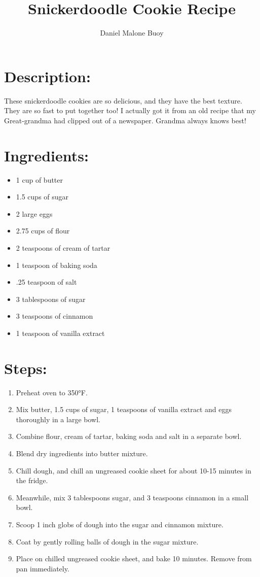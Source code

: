 \documentclass{article}
\title{Snickerdoodle Cookie Recipe}
\author{Daniel Malone Buoy}
\begin{document}
\maketitle

\section*{Description:}
These snickerdoodle cookies are so delicious, and they have the best texture. They are so fast to put together too! I actually got it from an old recipe that my Great-grandma had clipped out of a newspaper. Grandma always knows best!

\section*{Ingredients:}  
\begin{itemize}
\item 1 cup of butter 
\item 1.5 cups of sugar 
\item 2 large eggs 
\item 2.75 cups of flour 
\item 2 teaspoons of cream of tartar 
\item 1 teaspoon of baking soda 
\item .25 teaspoon of salt 
\item 3 tablespoons of sugar 
\item 3 teaspoons of cinnamon 
\item 1 teaspoon of vanilla extract
\end{itemize}

\section*{Steps:}
\begin{enumerate}
\item Preheat oven to 350°F.  
\item Mix butter, 1.5 cups of sugar, 1 teaspoons of vanilla extract and eggs thoroughly in a large bowl.
\item Combine flour, cream of tartar, baking soda and salt in a separate bowl.
\item Blend dry ingredients into butter mixture.
\item Chill dough, and chill an ungreased cookie sheet for about 10-15 minutes in the fridge.
\item Meanwhile, mix 3 tablespoons sugar, and 3 teaspoons cinnamon in a small bowl.
\item Scoop 1 inch globs of dough into the sugar and cinnamon mixture.
\item Coat by gently rolling balls of dough in the sugar mixture.
\item Place on chilled ungreased cookie sheet, and bake 10 minutes.  Remove from pan immediately.
\end{enumerate}
\end{document}

